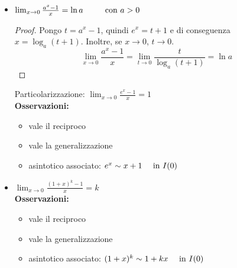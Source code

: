 \documentclass{book}     %
\begin{document}
\begin{itemize}
\item {$\lim_{x\to 0}\frac{a^x-1}{x}=\ln a~~~~~~~~\textnormal{con }a>0$}
\begin{proof}
Pongo $t=a^x-1$, quindi $e^x=t+1$ e di conseguenza $x=\log_a (t+1)$. Inoltre, se $x\to 0$, $t\to 0$.
\[\lim_{x\to 0}\frac{a^x-1}{x}=\lim_{t\to 0}\frac{t}{\log_a (t+1)}=\ln a\]
\end{proof}
Particolarizzazione: $\lim_{x\to 0}\frac{e^x-1}{x}=1$~\vspace{10pt}\\
\textbf{Osservazioni:}
\begin{itemize}
    \item vale il reciproco
    \item vale la generalizzazione
    \item asintotico associato: $e^x \sim x + 1 ~~~~\textnormal{in } I(0)$
\end{itemize}

\item {$\lim_{x\to 0}\frac{(1+x)^k-1}{x}=k$}~\vspace{10pt}\\
\textbf{Osservazioni:}
\begin{itemize}
    \item vale il reciproco
    \item vale la generalizzazione
    \item asintotico associato: $(1+x)^k \sim 1+kx ~~~~\textnormal{in } I(0)$
\end{itemize}
\end{itemize}
\end{document}
